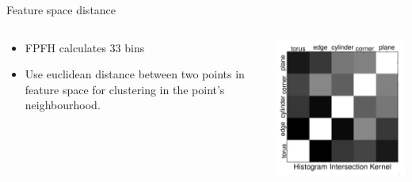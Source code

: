 \documentclass{beamer}
\begin{document}
\begin{frame}{Feature space distance}

\begin{columns}[T]

\begin{column}{0.5\textwidth}

\begin{itemize}
\item FPFH calculates 33 bins
\item Use euclidean distance between two points in feature space for clustering in the point's neighbourhood.
\end{itemize}  

\end{column}

\begin{column}{0.5\textwidth}

\includegraphics[width=1\textwidth]{pics/fpfh.png}

\end{column}

\end{columns}

\end{frame}
\end{document}
